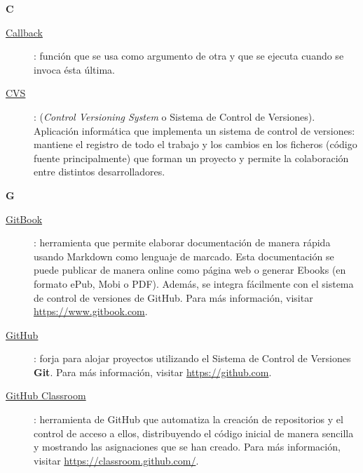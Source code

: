 \bigskip
{\bfseries {\Huge C}}\label{Apendice1:C}
\bigskip
\bigskip

\begin{description}
  \item[\underline{Callback}\label{apend1:callback}]: función que se usa como argumento de otra y que se ejecuta cuando se invoca ésta última. 
  \bigskip
\end{description}

\begin{description}
   \item[\underline{CVS}\label{apend1:cvs}]: (\textit{Control Versioning System} o Sistema de Control de Versiones). Aplicación informática que implementa un sistema de control de versiones: mantiene el registro de todo el trabajo y los cambios en los ficheros (código fuente principalmente) que forman un proyecto y permite la colaboración entre distintos desarrolladores.
  \bigskip
\end{description}


{\bfseries {\Huge G}}\label{Apendice1:G}
\bigskip
\bigskip

\begin{description}
  \item[\underline{GitBook}\label{apend1:gitbook}]: herramienta que permite elaborar documentación de manera rápida usando Markdown como lenguaje de marcado. Esta documentación se puede publicar de manera online como página web o generar Ebooks (en formato ePub, Mobi o PDF). Además, se integra fácilmente con el sistema de control de versiones de GitHub. Para más información, visitar {\small \url{https://www.gitbook.com}}.
  \bigskip
\end{description}

\begin{description}
  \item[\underline{GitHub}\label{apend1:github}]: forja para alojar proyectos utilizando el Sistema de Control de Versiones {\bfseries Git}. Para más información, visitar {\small \url{https://github.com}}.
  \bigskip
\end{description}

\begin{description}
  \item[\underline{GitHub Classroom}\label{apend1:github-classroom}]: herramienta de GitHub que automatiza la creación de repositorios y el control de acceso a ellos, distribuyendo el código inicial de manera sencilla y mostrando las asignaciones que se han creado. Para más información, visitar {\small \url{https://classroom.github.com/}}.
  \bigskip
\end{description}

